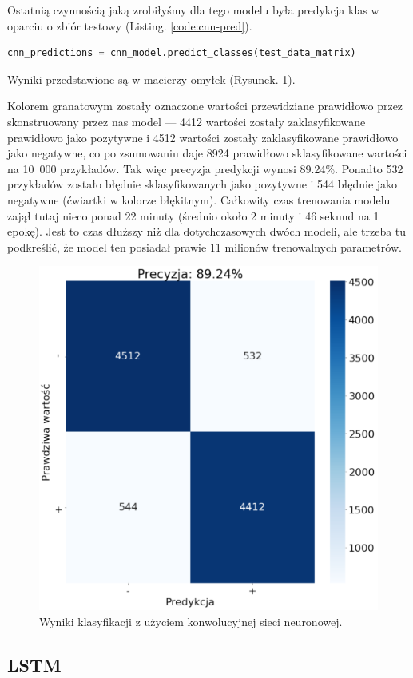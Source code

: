 \noindent Ostatnią czynnością jaką zrobiłyśmy dla tego modelu była predykcja klas w oparciu o zbiór testowy (Listing. \ref{code:cnn-pred}).

\begin{lstlisting}[language=Python,frame=single, breaklines=true, caption=Predykcja z użyciem modelu CNN.,label=code:cnn-pred]
cnn_predictions = cnn_model.predict_classes(test_data_matrix)
\end{lstlisting}

\noindent Wyniki przedstawione są w macierzy omyłek (Rysunek. \ref{fig:cnn-macierz}).

\noindent Kolorem granatowym zostały oznaczone wartości przewidziane prawidłowo przez skonstruowany przez nas model --- 4412 wartości zostały zaklasyfikowane prawidłowo jako pozytywne i 4512 wartości zostały zaklasyfikowane prawidłowo jako negatywne, co po zsumowaniu daje 8924 prawidłowo sklasyfikowane wartości na 10~000 przykładów. Tak więc precyzja predykcji wynosi 89.24\%. Ponadto 532 przykładów zostało błędnie sklasyfikowanych jako pozytywne i 544 błędnie jako negatywne (ćwiartki w kolorze błękitnym). Całkowity czas trenowania modelu zajął tutaj nieco ponad 22 minuty (średnio około 2 minuty i 46 sekund na 1 epokę). Jest to czas dłuższy niż dla dotychczasowych dwóch modeli, ale trzeba tu podkreślić, że model ten posiadał prawie 11 milionów trenowalnych parametrów.
\begin{figure}[H]
	\centering
	\includegraphics[width=0.5\linewidth]{images/chapter3/cnn-macierz.pdf}
	\caption{Wyniki klasyfikacji z użyciem konwolucyjnej sieci neuronowej.}
	\label{fig:cnn-macierz}
\end{figure}




\subsection{LSTM}

